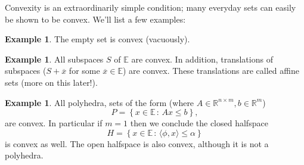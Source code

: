 \documentclass[11pt]{article}
\numberwithin{equation}{section}
\theoremstyle{definition}
\newtheorem{example}[theorem]{Example}
\newcommand{\bE}{\mathbb{E}}
\newcommand{\bR}{\mathbb{R}}
\newcommand{\set}[2]{\left\{#1\,:\,#2\right\}}
\begin{document}
Convexity is an extraordinarily simple condition; many everyday sets can easily be shown to be convex. We'll list a few examples:
\begin{example}
    The empty set is convex (vacuously).
\end{example}
\begin{example}
    All subspaces $S$ of $\bE$ are convex. In addition, translations of subspaces ($S+\overline x$ for some $\overline x\in\bE$) are convex. These translations are called affine sets (more on this later!).
\end{example}
\begin{example}
    All polyhedra, sets of the form (where $A\in\bR^{n\times m}, b\in\bR^m$)
    \begin{equation}
        P=\set{x\in\bE}{Ax\le b},
    \end{equation}
    are convex. In particular if $m=1$ then we conclude the closed halfspace
    \begin{equation}
        H=\set{x\in\bE}{\langle\phi, x\rangle \le \alpha}
    \end{equation}
    is convex as well. The open halfspace is also convex, although it is not a polyhedra.
\end{example}
\end{document}

